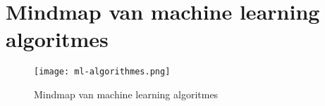 \section{Mindmap van machine learning algoritmes}\label{appendix:ml-mindmap}
\begin{figure}[hbt!]
  \centering
  \texttt{[image: ml-algorithmes.png]}
  \caption{Mindmap van machine learning algoritmes}
  \label{fig:ai-ml-nn-dl}
\end{figure}

\newpage